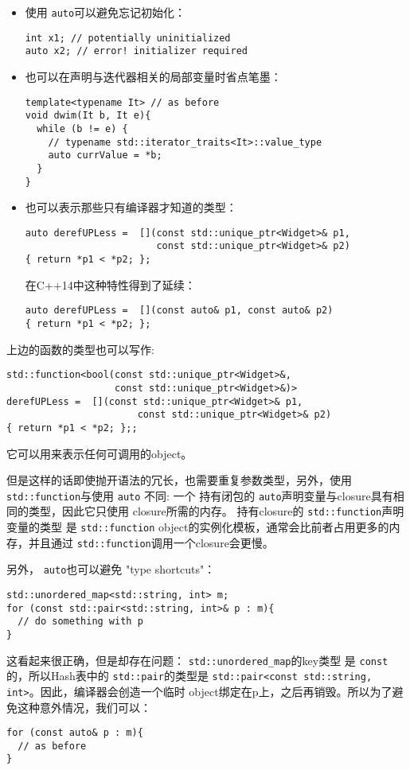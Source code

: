 \message{ !name(../CppLearning.tex)}\documentclass[a4paper,twoside]{article}
\theoremstyle{definition}
\theoremstyle{remark}
\numberwithin{equation}{section}
\let\OldTexttt\texttt
\renewcommand{\texttt}[1]{{\color{blue} \OldTexttt{#1}}}
\begin{document}
\begin{itemize}
\item 使用\texttt{auto}可以避免忘记初始化：
\begin{verbatim}
int x1; // potentially uninitialized
auto x2; // error! initializer required
\end{verbatim}
\item 也可以在声明与迭代器相关的局部变量时省点笔墨：
\begin{verbatim}
template<typename It> // as before
void dwim(It b, It e){
  while (b != e) {
    // typename std::iterator_traits<It>::value_type
    auto currValue = *b; 
  }
}
\end{verbatim}
\item 也可以表示那些只有编译器才知道的类型：
\begin{verbatim}
auto derefUPLess =  [](const std::unique_ptr<Widget>& p1,
                       const std::unique_ptr<Widget>& p2)
{ return *p1 < *p2; };
\end{verbatim}
  在C++14中这种特性得到了延续：
\begin{verbatim}
auto derefUPLess =  [](const auto& p1, const auto& p2)
{ return *p1 < *p2; };
\end{verbatim}
\end{itemize}

上边的函数的类型也可以写作:
\begin{verbatim}
std::function<bool(const std::unique_ptr<Widget>&,
                   const std::unique_ptr<Widget>&)>
derefUPLess =  [](const std::unique_ptr<Widget>& p1,
                       const std::unique_ptr<Widget>& p2)
{ return *p1 < *p2; };;
\end{verbatim}
它可以用来表示任何可调用的object。

但是这样的话即使抛开语法的冗长，也需要重复参数类型，另外，使用
\texttt{std::function}与使用\texttt{auto} 不同: 一个
持有闭包的\texttt{auto}声明变量与closure具有相同的类型，因此它只使用
closure所需的内存。 持有closure的\texttt{std::function}声明变量的类型
是\texttt{std::function}  object的实例化模板，通常会比前者占用更多的内
存，并且通过\texttt{std::function}调用一个closure会更慢。

另外，\texttt{auto}也可以避免 "type shortcuts"：
\begin{verbatim}
std::unordered_map<std::string, int> m;
for (const std::pair<std::string, int>& p : m){
  // do something with p
}
\end{verbatim}
这看起来很正确，但是却存在问题：\texttt{std::unordered\_map}的key类型
是\texttt{const}的，所以Hash表中的\texttt{std::pair}的类型是
\texttt{std::pair<const std::string, int>}。因此，编译器会创造一个临时
object绑定在p上，之后再销毁。所以为了避免这种意外情况，我们可以：
\begin{verbatim}
for (const auto& p : m){
  // as before
}
\end{verbatim}
\end{document}
